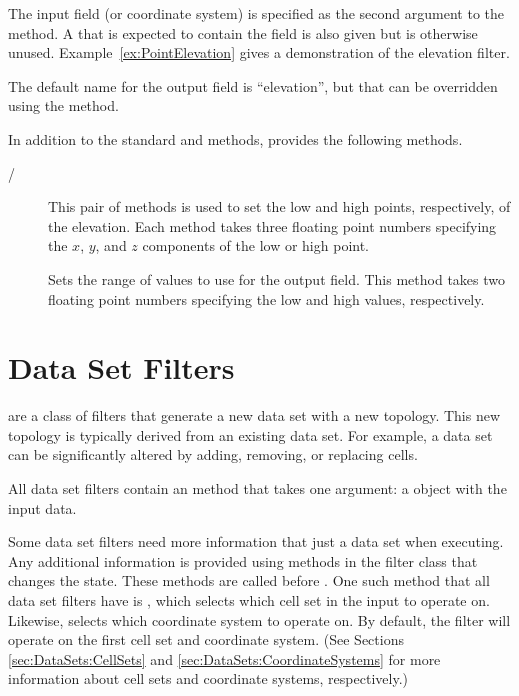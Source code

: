 The input field (or coordinate system) is specified as the second argument
to the  method. A  that is expected to
contain the field is also given but is otherwise unused.
Example~\ref{ex:PointElevation} gives a demonstration of the elevation
filter.

The default name for the output field is ``elevation'', but that can be
overridden using the  method.

In addition to the standard  and
 methods,  provides the
following methods.

\begin{description}
\item[/] This pair of methods
  is used to set the low and high points, respectively, of the elevation.
  Each method takes three floating point numbers specifying the $x$, $y$,
  and $z$ components of the low or high point.
\item[] Sets the range of values to use for the output
  field. This method takes two floating point numbers specifying the low
  and high values, respectively.
\end{description}




\section{Data Set Filters}


 are a class of filters that generate a new data
set with a new topology. This new topology is typically derived from an
existing data set. For example, a data set can be significantly altered by
adding, removing, or replacing cells.

All data set filters contain an  method that takes one
argument: a  object with the input data.

Some data set filters need more information that just a data set when
executing. Any additional information is provided using methods in the
filter class that changes the state. These methods are called before
. One such method that all data set filters have is
, which selects which cell set in the input
 to operate on. Likewise,
 selects which coordinate system to
operate on. By default, the filter will operate on the first cell set and
coordinate system. (See Sections \ref{sec:DataSets:CellSets} and
\ref{sec:DataSets:CoordinateSystems} for more information about cell sets
and coordinate systems, respectively.)

